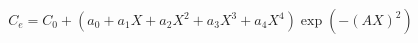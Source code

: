 \documentclass[12pt]{article}
\begin{document}
$$ 
  C_e = C_0 + (a_0 + a_1 X + a_2 X^2 + a_3 X^3 + a_4 X^4) \exp (-(AX)^2)
$$
\end{document}
